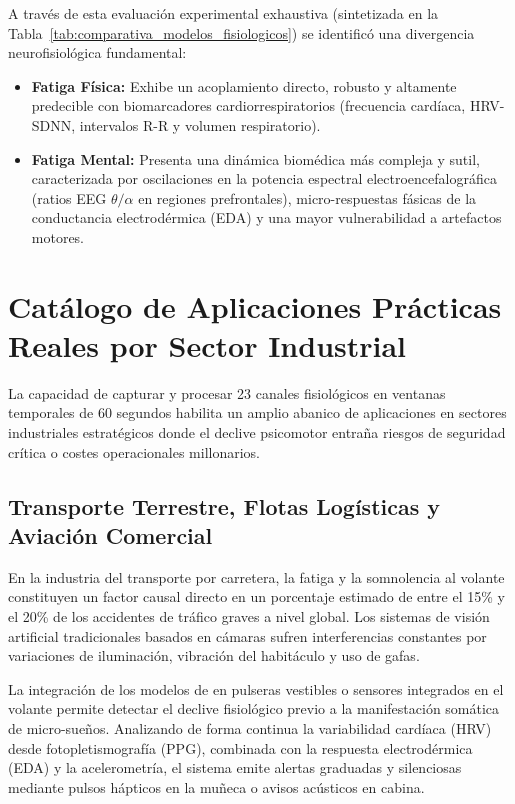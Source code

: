A través de esta evaluación experimental exhaustiva (sintetizada en la Tabla~\ref{tab:comparativa_modelos_fisiologicos}) se identificó una divergencia neurofisiológica fundamental:
\begin{itemize}
    \item \textbf{Fatiga Física:} Exhibe un acoplamiento directo, robusto y altamente predecible con biomarcadores cardiorrespiratorios (frecuencia cardíaca, HRV-SDNN, intervalos R-R y volumen respiratorio).
    \item \textbf{Fatiga Mental:} Presenta una dinámica biomédica más compleja y sutil, caracterizada por oscilaciones en la potencia espectral electroencefalográfica (ratios EEG $\theta/\alpha$ en regiones prefrontales), micro-respuestas fásicas de la conductancia electrodérmica (EDA) y una mayor vulnerabilidad a artefactos motores.
\end{itemize}



\section{Catálogo de Aplicaciones Prácticas Reales por Sector Industrial}
\label{sec:val_sectores}

La capacidad de capturar y procesar 23 canales fisiológicos en ventanas temporales de 60 segundos habilita un amplio abanico de aplicaciones en sectores industriales estratégicos donde el declive psicomotor entraña riesgos de seguridad crítica o costes operacionales millonarios.

\subsection{Transporte Terrestre, Flotas Logísticas y Aviación Comercial}

En la industria del transporte por carretera, la fatiga y la somnolencia al volante constituyen un factor causal directo en un porcentaje estimado de entre el 15\% y el 20\% de los accidentes de tráfico graves a nivel global. Los sistemas de visión artificial tradicionales basados en cámaras sufren interferencias constantes por variaciones de iluminación, vibración del habitáculo y uso de gafas.

La integración de los modelos de  en pulseras vestibles o sensores integrados en el volante permite detectar el declive fisiológico previo a la manifestación somática de micro-sueños. Analizando de forma continua la variabilidad cardíaca (HRV) desde fotopletismografía (PPG), combinada con la respuesta electrodérmica (EDA) y la acelerometría, el sistema emite alertas graduadas y silenciosas mediante pulsos hápticos en la muñeca o avisos acústicos en cabina.

